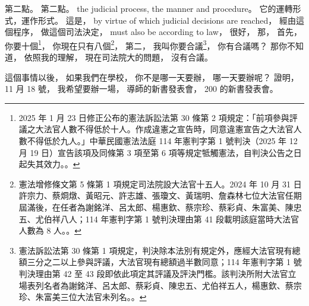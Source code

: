 \hypertarget{w02:cue:1347}{}第二點。
\hypertarget{w02:cue:1348}{}第二點。
\hypertarget{w02:cue:1349}{}the judicial process, the manner and procedure。
\hypertarget{w02:cue:1350}{}它的運轉形式，運作形式。
\hypertarget{w02:cue:1351}{}這是，
\hypertarget{w02:cue:1352}{}by virtue of which judicial decisions are reached，
\hypertarget{w02:cue:1353}{}經由這個程序，
\hypertarget{w02:cue:1354}{}做這個司法決定，
\hypertarget{w02:cue:1355}{}must also be according to law，
\hypertarget{w02:cue:1356}{}很好，
\hypertarget{w02:cue:1357}{}那，
\hypertarget{w02:cue:1358}{}首先，
\hypertarget{w02:cue:1359}{}你要十個\footnote{2025 年 1 月 23 日修正公布的憲法訴訟法第 30 條第 2 項規定：「前項參與評議之大法官人數不得低於十人。作成違憲之宣告時，同意違憲宣告之大法官人數不得低於九人。」中華民國憲法法庭 114 年憲判字第 1 號判決（2025 年 12 月 19 日）宣告該項及同條第 3 項至第 6 項等規定牴觸憲法，自判決公告之日起失其效力。\cite{ccj114-1}。}，
\hypertarget{w02:cue:1360}{}你現在只有八個\footnote{憲法增修條文第 5 條第 1 項規定司法院設大法官十五人。2024 年 10 月 31 日許宗力、蔡烱燉、黃昭元、許志雄、張瓊文、黃瑞明、詹森林七位大法官任期屆滿後，在任者為謝銘洋、呂太郎、楊惠欽、蔡宗珍、蔡彩貞、朱富美、陳忠五、尤伯祥八人；114 年憲判字第 1 號判決理由第 41 段載明該庭當時大法官人數為 8 人。\cite[41]{ccj114-1}。}，
\hypertarget{w02:cue:1361}{}第二，
\hypertarget{w02:cue:1362}{}我叫你要合議\footnote{憲法訴訟法第 30 條第 1 項規定，判決除本法別有規定外，應經大法官現有總額三分之二以上參與評議，大法官現有總額過半數同意；114 年憲判字第 1 號判決理由第 42 至 43 段即依此項定其評議及評決門檻。該判決所附大法官立場表列名者為謝銘洋、呂太郎、蔡彩貞、陳忠五、尤伯祥五人，楊惠欽、蔡宗珍、朱富美三位大法官未列名。\cite[42–43]{ccj114-1}。}，
\hypertarget{w02:cue:1363}{}你有合議嗎？
\hypertarget{w02:cue:1364}{}那你不知道，
\hypertarget{w02:cue:1365}{}依照我的理解，
\hypertarget{w02:cue:1366}{}現在司法院大的問題，
\hypertarget{w02:cue:1367}{}沒有合議。

\hypertarget{w02:cue:1368}{}這個事情以後，
\hypertarget{w02:cue:1369}{}如果我們在學校，
\hypertarget{w02:cue:1370}{}你不是哪一天要辦，
\hypertarget{w02:cue:1371}{}哪一天要辦呢？
\hypertarget{w02:cue:1372}{}證明，
\hypertarget{w02:cue:1373}{}11 月 18 號，
\hypertarget{w02:cue:1374}{}我希望要辦一場，
\hypertarget{w02:cue:1375}{}導師的新書發表會，
\hypertarget{w02:cue:1376}{}200 的新書發表會。

